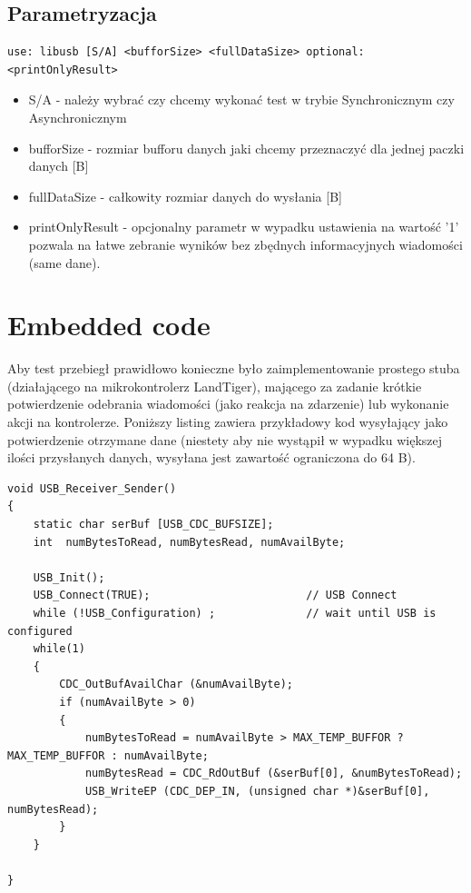 \documentclass{BscUS}
\begin{document}
\subsection{Parametryzacja}
\begin{lstlisting}[caption={uruchomienie testu}]
use: libusb [S/A] <bufforSize> <fullDataSize> optional:<printOnlyResult>
\end{lstlisting}
\begin{itemize}
\item S/A - należy wybrać czy chcemy wykonać test w trybie Synchronicznym czy Asynchronicznym
\item bufforSize - rozmiar bufforu danych jaki chcemy przeznaczyć dla jednej paczki danych [B]
\item fullDataSize - całkowity rozmiar danych do wysłania [B]
\item printOnlyResult - opcjonalny parametr w wypadku ustawienia na wartość '1' pozwala na łatwe zebranie wyników bez zbędnych informacyjnych wiadomości (same dane). 
\end{itemize}
\section{Embedded code}
Aby test przebiegł prawidłowo konieczne było zaimplementowanie prostego stuba (działającego na mikrokontrolerz LandTiger), mającego za zadanie krótkie potwierdzenie odebrania wiadomości (jako reakcja na zdarzenie) lub wykonanie akcji na kontrolerze. Poniższy listing zawiera przykładowy kod wysyłający jako potwierdzenie otrzymane dane (niestety aby nie wystąpił w wypadku większej ilości przysłanych danych, wysyłana jest zawartość ograniczona do 64 B). \cite{embeddedC, embeddedSystems, bootstrapLinUSB}
\begin{lstlisting}[caption={Funkcja USB\_Receiver\_Sender},label={lst:FUSBSenderReceiver}]
void USB_Receiver_Sender()
{
	static char serBuf [USB_CDC_BUFSIZE];
	int  numBytesToRead, numBytesRead, numAvailByte;

	USB_Init();
	USB_Connect(TRUE);                        // USB Connect
	while (!USB_Configuration) ;              // wait until USB is configured
	while(1)
	{
		CDC_OutBufAvailChar (&numAvailByte);
		if (numAvailByte > 0)
		{
		  	numBytesToRead = numAvailByte > MAX_TEMP_BUFFOR ? MAX_TEMP_BUFFOR : numAvailByte;
		    numBytesRead = CDC_RdOutBuf (&serBuf[0], &numBytesToRead);
		    USB_WriteEP (CDC_DEP_IN, (unsigned char *)&serBuf[0], numBytesRead);
		}
	}

}
\end{lstlisting}
\end{document}
